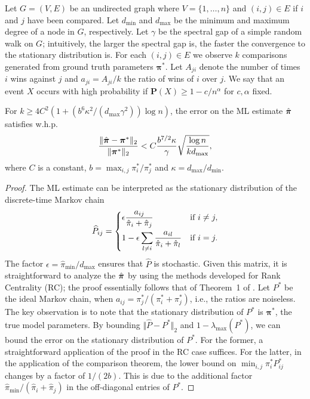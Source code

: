 Let $G = (V, E)$ be an undirected graph where $V = \{ 1, \ldots, n \}$ and $(i, j) \in E$ if $i$ and $j$ have been compared.
Let $d_{\min}$ and $d_{\max}$ be the minimum and maximum degree of a node in $G$, respectively.
Let $\gamma$ be the spectral gap of a simple random walk on $G$;
intuitively, the larger the spectral gap is, the faster the convergence to the stationary distribution is.
For each $(i, j) \in E$ we observe $k$ comparisons generated from ground truth parameters $\bm{\pi}^*$.
Let $A_{ji}$ denote the number of times $i$ wins against $j$ and $a_{ji} = A_{ji} / k$ the ratio of wins of $i$ over $j$.
We say that an event $X$ occurs with high probability if $\mathbf{P}(X) \ge 1 - c / n^\alpha$ for $c, \alpha$ fixed.

\begin{theorem}
\label{fix:thm:mlbound}
For $k \ge 4C^2 (1 + (b^6 \kappa^2 / (d_{\max} \gamma^2)) \log n)$, the error on the ML estimate $\hat{\bm{\pi}}$ satisfies w.h.p.
\begin{align}
\frac{\Vert \hat{\bm{\pi}} - \bm{\pi}^* \Vert_2}{\Vert \bm{\pi}^* \Vert_2} < C \frac{b^{7/2} \kappa}{\gamma} \sqrt{\frac{\log n}{kd_{\max}}},
\end{align}
where $C$ is a constant, $b = \max_{i,j} \pi^*_i / \pi^*_j$ and $\kappa = d_{\max} / d_{\min}$.
\end{theorem}

\begin{proof}
The ML estimate can be interpreted as the stationary distribution of the discrete-time Markov chain
\begin{align}
\label{fix:eq:mlchain}
  \widehat{P}_{ij} =
  \begin{dcases}
    \epsilon \frac{a_{ij}}{\hat{\pi}_i + \hat{\pi}_j}                    & \text{if } i \ne j, \\
    1 - \epsilon \sum_{l \ne i} \frac{a_{il}}{\hat{\pi}_i + \hat{\pi}_l} & \text{if } i = j.
  \end{dcases}
\end{align}
The factor $\epsilon = \hat{\pi}_{\min} / d_{\max}$ ensures that $\widehat{P}$ is stochastic.
Given this matrix, it is straightforward to analyze the $\hat{\bm{\pi}}$ by using the methods developed for Rank Centrality (RC);
the proof essentially follows that of Theorem~1 of \citet{negahban2017rank}.
Let $P^*$ be the ideal Markov chain, when  $a_{ij} = \pi^*_j / (\pi^*_i + \pi^*_j)$, i.e., the ratios are noiseless.
The key observation is to note that the stationary distribution of $P^*$ is $\bm{\pi}^*$, the true model parameters.
By bounding $\Vert \widehat{P} - P^* \Vert_2$ and $1 - \lambda_{\max}(P^*)$, we can bound the error on the stationary distribution of $P^*$.
For the former, a straightforward application of the proof in the RC case suffices.
For the latter, in the application of the comparison theorem, the lower bound on $\min_{i,j} \pi^*_i P^*_{ij}$ changes by a factor of $1/(2b)$.
This is due to the additional factor $\hat{\pi}_{\min} / (\hat{\pi}_i + \hat{\pi}_j)$ in the off-diagonal entries of $P^*$.
\end{proof}

